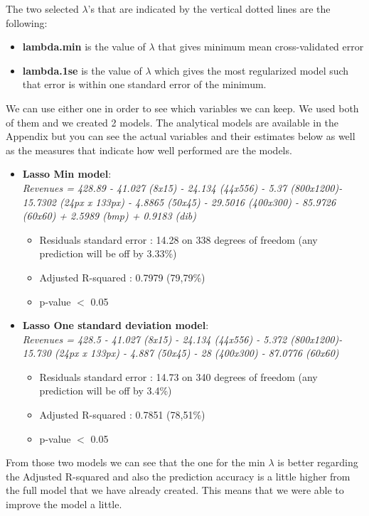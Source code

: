 \documentclass{article}
\begin{document}
The two selected $\lambda$’s that are indicated by the vertical dotted lines are the following:
\begin{itemize}
 \item \textbf{lambda.min} is the value of $\lambda$ that gives minimum mean cross-validated error
 \item \textbf{lambda.1se} is the value of $\lambda$ which gives the most regularized model such that error is within one standard error of the minimum.
 \end{itemize}  
We can use either one in order to see which variables we can keep. We used both of them and we created 2 models. The analytical models are available in the Appendix but you can see the actual variables and their estimates below as well as the measures that indicate how well performed are the models.
\begin{itemize}
\item \textbf{Lasso Min model}:\\
\textit{Revenues = 428.89 - 41.027 (8x15) - 24.134 (44x556) - 5.37 (800x1200)- 15.7302 (24px x 133px) - 4.8865 (50x45) - 29.5016 (400x300) - 85.9726 (60x60) + 2.5989 (bmp) + 0.9183 (dib)}\\
\begin{itemize}
\item Residuals standard error : 14.28 on 338 degrees of freedom (any prediction will be off by 3.33\%)
\item Adjusted R-squared : 0.7979 (79,79\%)
\item p-value $<$ 0.05
\end{itemize}

\item \textbf{Lasso One standard deviation model}:\\
\textit{Revenues = 428.5 - 41.027 (8x15) - 24.134 (44x556) - 5.372 (800x1200)- 15.730 (24px x 133px) - 4.887 (50x45) - 28 (400x300) - 87.0776 (60x60)}
\begin{itemize}
\item Residuals standard error : 14.73 on 340 degrees of freedom (any prediction will be off by 3.4\%)
\item Adjusted R-squared : 0.7851 (78,51\%)
\item p-value $<$ 0.05
\end{itemize}
\end{itemize}
From those two models we can see that the one for the min $\lambda$ is better regarding the Adjusted R-squared and also the prediction accuracy is a little higher from the full model that we have already created. This means that we were able to improve the model a little.
\end{document}
